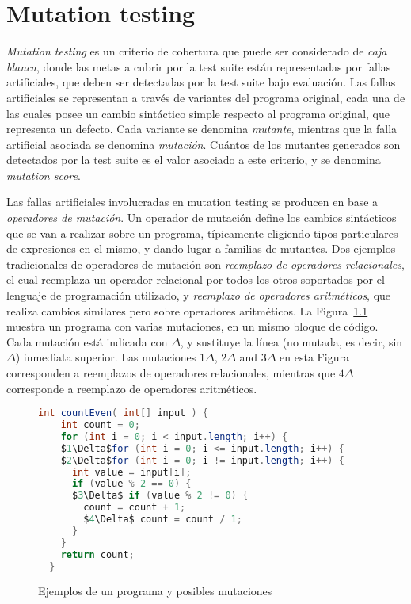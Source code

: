 \chapter[Mutation]{Mutation testing}
\label{cap:preliminares.mutation}

\emph{Mutation testing} es un criterio de cobertura que puede ser considerado de \emph{caja blanca}, donde las metas a cubrir por la test suite est\'an representadas por fallas artificiales, que deben ser detectadas por la test suite bajo evaluaci\'on. Las fallas artificiales se representan a trav\'es de variantes del programa original, cada una de las cuales posee un cambio sint\'actico simple respecto al programa original, que representa un defecto. Cada variante se denomina \emph{mutante}, mientras que la falla artificial asociada se denomina \emph{mutaci\'on}. Cu\'antos de los mutantes generados son detectados por la test suite es el valor asociado a este criterio, y se denomina \emph{mutation score}.

Las fallas artificiales involucradas en mutation testing se producen en base a \emph{operadores de mutaci\'on}. Un operador de mutaci\'on define los cambios sint\'acticos que se van a realizar sobre un programa, t\'ipicamente eligiendo tipos particulares de expresiones en el mismo, y dando lugar a familias de mutantes. Dos ejemplos tradicionales de operadores de mutaci\'on son \emph{reemplazo de operadores relacionales}, el cual reemplaza un operador relacional por todos los otros soportados por el lenguaje de programaci\'on utilizado, y \emph{reemplazo de operadores aritm\'eticos}, que realiza cambios similares pero sobre operadores aritm\'eticos. La Figura~\ref{figures.examples.mutations} muestra un programa con varias mutaciones, en un mismo bloque de c\'odigo. Cada mutaci\'on est\'a indicada con $\Delta$, y sustituye la l\'inea (no mutada, es decir, sin $\Delta$) inmediata superior. Las mutaciones $1\Delta$, $2\Delta$ and $3\Delta$ en esta Figura corresponden a reemplazos de operadores relacionales, mientras que $4\Delta$ corresponde a reemplazo de operadores aritm\'eticos.

\begin{figure}[t]
	\begin{lstlisting}[frame=tlrb, mathescape=true,language=Java,basicstyle={}]
  int countEven( int[] input ) {
    int count = 0;
    for (int i = 0; i < input.length; i++) {
    $1\Delta$for (int i = 0; i <= input.length; i++) {
    $2\Delta$for (int i = 0; i != input.length; i++) {
      int value = input[i];
      if (value % 2 == 0) {
      $3\Delta$ if (value % 2 != 0) {
        count = count + 1;
        $4\Delta$ count = count / 1;
      }
    }
    return count;
  }
	\end{lstlisting}
	\caption{Ejemplos de un programa y posibles mutaciones}
	\label{figures.examples.mutations}
\end{figure}

